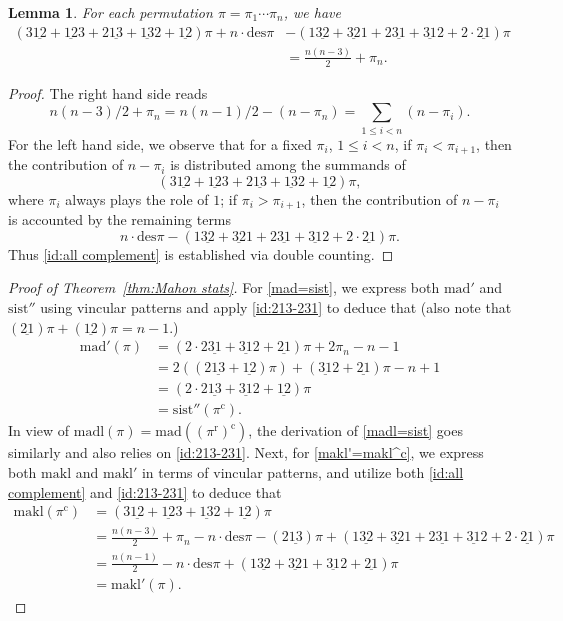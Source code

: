 \documentclass[12pt]{amsart}
\numberwithin{equation}{section}
\theoremstyle{plain}
\newtheorem{lemma}[theorem]{Lemma}
\theoremstyle{definition}
\def\cc{\mathrm{c}}
\def\r{\mathrm{r}}
\def\des{\mathrm{des}}
\def\pprs{\mathrm{2\underline{13}}}
\def\ppwrs{\mathrm{2\underline{31}}}
\def\pp31-2{\mathrm{\underline{31}2}}
\def\mad{\mathrm{mad}}
\def\makl{\mathrm{makl}}
\def\madl{\mathrm{madl}}
\def\sist{\mathrm{sist}}
\def\sist{\mathrm{sist}}
\begin{document}
\begin{lemma}
For each permutation $\pi=\pi_1\cdots\pi_n$, we have
\begin{align}
\label{id:all complement}
(3\underline{12}+\underline{12}3+\pprs+\underline{13}2+\underline{12})\pi+n\cdot\des\pi &-(1\underline{32}+\underline{32}1+\ppwrs+\pp31-2+2\cdot\underline{21})\pi\\
&=\frac{n(n-3)}{2}+\pi_n.\nonumber
\end{align}
\end{lemma}
\begin{proof}
The right hand side reads
$$n(n-3)/2+\pi_n=n(n-1)/2-(n-\pi_n)=\sum_{1\le i<n}(n-\pi_i).$$
For the left hand side, we observe that for a fixed $\pi_i$, $1\le i<n$, if $\pi_i<\pi_{i+1}$, then the contribution of $n-\pi_i$ is distributed among the summands of
$$(3\underline{12}+\underline{12}3+\pprs+\underline{13}2+\underline{12})\pi,$$
where $\pi_i$ always plays the role of $1$; if $\pi_i>\pi_{i+1}$, then the contribution of $n-\pi_i$ is accounted by the remaining terms
$$n\cdot\des\pi -(1\underline{32}+\underline{32}1+\ppwrs+\pp31-2+2\cdot\underline{21})\pi.$$
Thus \eqref{id:all complement} is established via double counting.
\end{proof}

\begin{proof}[Proof of Theorem~\ref{thm:Mahon stats}]
For \eqref{mad=sist}, we express both $\mad'$ and $\sist''$ using vincular patterns and apply \eqref{id:213-231} to deduce that (also note that $(\underline{21})\pi+(\underline{12})\pi=n-1$.)
\begin{align*}
\mad'(\pi) &= (2\cdot\ppwrs+\pp31-2+\mathrm{\underline{21}})\pi+2\pi_n-n-1\\
&= 2((\pprs+\mathrm{\underline{12}})\pi)+(\pp31-2+\mathrm{\underline{21}})\pi-n+1\\
&= (2\cdot\pprs+\pp31-2+\mathrm{\underline{12}})\pi\\
&= \sist''(\pi^{\cc}).
\end{align*}
In view of $\madl(\pi)=\mad((\pi^{\r})^{\cc})$, the derivation of \eqref{madl=sist} goes similarly and also relies on \eqref{id:213-231}. Next, for \eqref{makl'=makl^c}, we express both $\makl$ and $\makl'$ in terms of vincular patterns, and utilize both \eqref{id:all complement} and \eqref{id:213-231} to deduce that
\begin{align*}
\makl(\pi^{\cc}) &= (3\underline{12}+\underline{12}3+\underline{13}2+\underline{12})\pi\\
&= \frac{n(n-3)}{2}+\pi_n-n\cdot\des\pi-(\pprs)\pi+(1\underline{32}+\underline{32}1+\ppwrs+\pp31-2+2\cdot\underline{21})\pi\\
&= \frac{n(n-1)}{2}-n\cdot\des\pi+(1\underline{32}+\underline{32}1+\pp31-2+\underline{21})\pi\\
&= \makl'(\pi).
\end{align*}
\end{proof}
\end{document}
